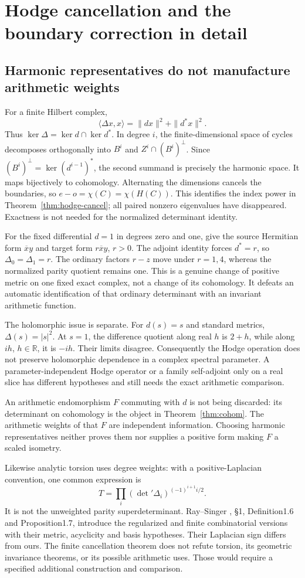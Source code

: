 \section{Hodge cancellation and the boundary correction in detail}
\subsection{Harmonic representatives do not manufacture arithmetic weights}
For a finite Hilbert complex,
\[
 \langle\Delta x,x\rangle=\|dx\|^2+\|d^*x\|^2.
\]
Thus $\ker\Delta=\ker d\cap\ker d^*$. In degree $i$, the finite-dimensional space of cycles decomposes orthogonally into $B^i$ and $Z^i\cap(B^i)^\perp$. Since $(B^i)^\perp=\ker(d^{i-1})^*$, the second summand is precisely the harmonic space. It maps bijectively to cohomology. Alternating the dimensions cancels the boundaries, so $e-o=\chi(C)=\chi(H(C))$. This identifies the index power in Theorem~\ref{thm:hodge-cancel}; all paired nonzero eigenvalues have disappeared. Exactness is not needed for the normalized determinant identity.

For the fixed differential $d=1$ in degrees zero and one, give the source Hermitian form $\overline xy$ and target form $r\overline xy$, $r>0$. The adjoint identity forces $d^*=r$, so $\Delta_0=\Delta_1=r$. The ordinary factors $r-z$ move under $r=1,4$, whereas the normalized parity quotient remains one. This is a genuine change of positive metric on one fixed exact complex, not a change of its cohomology. It defeats an automatic identification of that ordinary determinant with an invariant arithmetic function.

The holomorphic issue is separate. For $d(s)=s$ and standard metrics, $\Delta(s)=|s|^2$. At $s=1$, the difference quotient along real $h$ is $2+h$, while along $ih$, $h\in\mathbb R$, it is $-ih$. Their limits disagree. Consequently the Hodge operation does not preserve holomorphic dependence in a complex spectral parameter. A parameter-independent Hodge operator or a family self-adjoint only on a real slice has different hypotheses and still needs the exact arithmetic comparison.

An arithmetic endomorphism $F$ commuting with $d$ is not being discarded: its determinant on cohomology is the object in Theorem~\ref{thm:cohom}. The arithmetic weights of that $F$ are independent information. Choosing harmonic representatives neither proves them nor supplies a positive form making $F$ a scaled isometry.

Likewise analytic torsion uses degree weights: with a positive-Laplacian convention, one common expression is
\[
 T=\prod_i(\det{}'\Delta_i)^{(-1)^{i+1}i/2}.
\]
It is not the unweighted parity superdeterminant. Ray--Singer \cite{RaySinger}, \S1, Definition1.6 and Proposition1.7, introduce the regularized and finite combinatorial versions with their metric, acyclicity and basis hypotheses. Their Laplacian sign differs from ours. The finite cancellation theorem does not refute torsion, its geometric invariance theorems, or its possible arithmetic uses. Those would require a specified additional construction and comparison.

